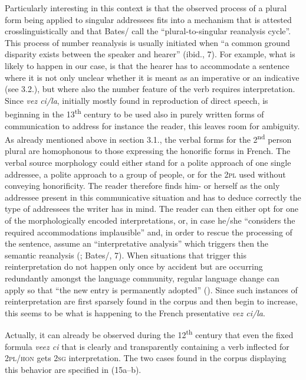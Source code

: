 \documentclass[output=paper]{langscibook}
\begin{document}
\begin{itemize}
\begin{itemize}
\begin{itemize}
\begin{itemize}
\begin{itemize}
\begin{itemize}
\begin{itemize}
\begin{itemize}
\begin{itemize}
\begin{itemize}
\begin{itemize}
\begin{itemize}
Particularly interesting in this context is that the observed process of a plural form being applied to singular addressees fits into a mechanism that is attested crosslinguistically and that Bates/\citet{McKenzie2021} call the “plural-to-singular reanalysis cycle”. This process of number reanalysis is usually initiated when “a common ground disparity exists between the speaker and hearer” (ibid., 7). For example, what is likely to happen in our case, is that the hearer has to accommodate a sentence where it is not only unclear whether it is meant as an imperative or an indicative (see 3.2.), but where also the number feature of the verb requires interpretation. Since \textit{vez ci/la}, initially mostly found in reproduction of direct speech, is beginning in the 13\textsuperscript{th} century to be used also in purely written forms of communication to address for instance the reader, this leaves room for ambiguity. As already mentioned above in section 3.1., the verbal forms for the 2\textsuperscript{nd} person plural are homophonous to those expressing the honorific forms in French. The verbal source morphology could either stand for a polite approach of one single addressee, a polite approach to a group of people, or for the \textsc{2pl} used without conveying honorificity. The reader therefore finds him- or herself as the only addressee present in this communicative situation and has to deduce correctly the type of addressees the writer has in mind. The reader can then either opt for one of the morphologically encoded interpretations, or, in case he/she “considers the required accommodations implausible” and, in order to rescue the processing of the sentence, assume an “interpretative analysis” which triggers then the semantic reanalysis (\citealt{Eckardt2012,Eckardt2688}; Bates/\citealt{McKenzie2021}, 7). When situations that trigger this reinterpretation do not happen only once by accident but are occurring redundantly amongst the language community, regular language change can apply so that “the new entry is permanently adopted” (\citealt{Eckart2012,Eckart2688}). Since such instances of reinterpretation are first sparsely found in the corpus and then begin to increase, this seems to be what is happening to the French presentative \textit{vez ci/la}. 

Actually, it can already be observed during the 12\textsuperscript{th} century that even the fixed formula \textit{veez ci} that is clearly and transparently containing a verb inflected for \textsc{2pl/hon} gets \textsc{2sg} interpretation. The two cases found in the corpus displaying this behavior are specified in (15a–b). 


\end{itemize}
\end{itemize}
\end{itemize}
\end{itemize}
\end{itemize}
\end{itemize}
\end{itemize}
\end{itemize}
\end{itemize}
\end{itemize}
\end{itemize}
\end{itemize}
\end{document}
